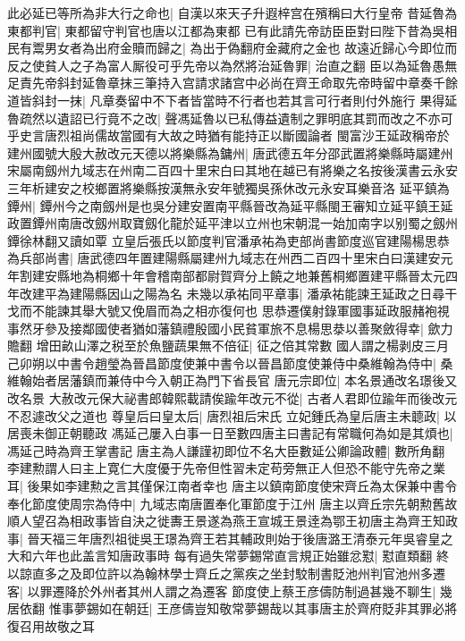 此必延已等所為非大行之命也|{
	自漢以來天子升遐梓宫在殯稱曰大行皇帝}
昔延魯為東都判官|{
	東都留守判官也唐以江都為東都}
已有此請先帝訪臣臣對曰陛下昔為吳相民有鬻男女者為出府金贖而歸之|{
	為出于偽翻府金藏府之金也}
故遠近歸心今即位而反之使貧人之子為富人厮役可乎先帝以為然將治延魯罪|{
	治直之翻}
臣以為延魯愚無足責先帝斜封延魯章抹三筆持入宫請求諸宫中必尚在齊王命取先帝時留中章奏千餘道皆斜封一抹|{
	凡章奏留中不下者皆當時不行者也若其言可行者則付外施行}
果得延魯疏然以遺詔已行竟不之改|{
	聲馮延魯以已私傳益遺制之罪明底其罰而改之不亦可乎史言唐烈祖尚儒故當國有大故之時猶有能持正以斷國論者}
閩富沙王延政稱帝於建州國號大殷大赦改元天德以將樂縣為鏞州|{
	唐武德五年分邵武置將樂縣時屬建州宋屬南劔州九域志在州南二百四十里宋白曰其地在越已有將樂之名按後漢書云永安三年析建安之校鄉置將樂縣按漢無永安年號獨吳孫休改元永安耳樂音洛}
延平鎮為鐔州|{
	鐔州今之南劔州是也吳分建安置南平縣晉改為延平縣閩王審知立延平鎮王延政置鐔州南唐改劔州取寶劔化龍於延平津以立州也宋朝混一始加南字以别蜀之劔州鐔徐林翻又讀如覃}
立皇后張氏以節度判官潘承祐為吏部尚書節度巡官建陽楊思恭為兵部尚書|{
	唐武德四年置建陽縣屬建州九域志在州西二百四十里宋白曰漢建安元年割建安縣地為桐鄉十年會稽南部都尉賀齊分上饒之地兼舊桐鄉置建平縣晉太元四年改建平為建陽縣因山之陽為名}
未幾以承祐同平章事|{
	潘承祐能諫王延政之日尋干戈而不能諫其舉大號又俛眉而為之相亦復何也}
思恭遷僕射錄軍國事延政服赭袍視事然牙參及接鄰國使者猶如藩鎮禮殷國小民貧軍旅不息楊思㳟以善聚斂得幸|{
	歛力贍翻}
增田畝山澤之税至於魚鹽蔬果無不倍征|{
	征之倍其常數}
國人謂之楊剥皮三月己卯朔以中書令趙瑩為晉昌節度使兼中書令以晉昌節度使兼侍中桑維翰為侍中|{
	桑維翰始者居藩鎮而兼侍中今入朝正為門下省長官}
唐元宗即位|{
	本名景通改名璟後又改名景}
大赦改元保大祕書郎韓熙載請俟踰年改元不從|{
	古者人君即位踰年而後改元不忍遽改父之道也}
尊皇后曰皇太后|{
	唐烈祖后宋氏}
立妃鍾氏為皇后唐主未聼政|{
	以居喪未御正朝聽政}
馮延己屢入白事一日至數四唐主曰書記有常職何為如是其煩也|{
	馮延己時為齊王掌書記}
唐主為人謙謹初即位不名大臣數延公卿論政體|{
	數所角翻}
李建勲謂人曰主上寛仁大度優于先帝但性習未定苟旁無正人但恐不能守先帝之業耳|{
	後果如李建勲之言其僅保江南者幸也}
唐主以鎮南節度使宋齊丘為太保兼中書令奉化節度使周宗為侍中|{
	九域志南唐置奉化軍節度于江州}
唐主以齊丘宗先朝勲舊故順人望召為相政事皆自決之徙夀王景遂為燕王宣城王景逹為鄂王初唐主為齊王知政事|{
	晉天福三年唐烈祖徙吳王璟為齊王若其輔政則始于後唐潞王清泰元年吳睿皇之大和六年也此盖言知唐政事時}
每有過失常夢錫常直言規正始雖忿懟|{
	懟直類翻}
終以諒直多之及即位許以為翰林學士齊丘之黨疾之坐封駮制書貶池州判官池州多遷客|{
	以罪遷降於外州者其州人謂之為遷客}
節度使上蔡王彦儔防制過甚幾不聊生|{
	幾居依翻}
惟事夢錫如在朝廷|{
	王彦儔豈知敬常夢錫哉以其事唐主於齊府貶非其罪必將復召用故敬之耳}
